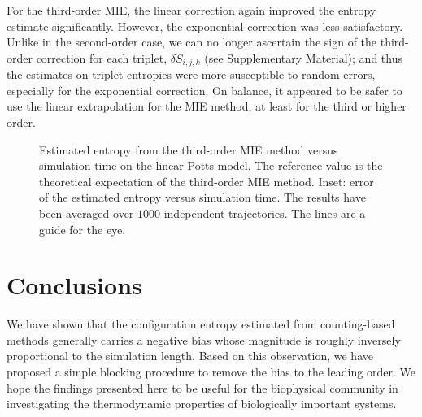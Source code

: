 \documentclass[reprint, superscriptaddress]{revtex4-1}
\begin{document}
For the third-order MIE,
the linear correction again improved the entropy estimate
significantly.
However, the exponential correction was less satisfactory.
%
Unlike in the second-order case,
we can no longer ascertain the sign of
the third-order correction for each triplet,
$\delta S_{i, j, k}$ (see Supplementary Material); %
and thus the estimates on triplet entropies
were more susceptible to random errors,
especially for the exponential correction.
%
On balance, it appeared to be safer
to use the linear extrapolation for the MIE method,
at least for the third or higher order.

\begin{figure}[h]\centering
  \caption{
    \label{fig:potts_mie3rd}
    Estimated entropy from the third-order MIE method
    versus simulation time on the linear Potts model.
    The reference value is the theoretical expectation
    of the third-order MIE method.
    Inset: error of the estimated entropy
    versus simulation time.
    The results have been averaged over $1000$ independent trajectories.
    The lines are a guide for the eye.
  }
\end{figure}

\section{Conclusions}

We have shown that the configuration entropy estimated from counting-based methods
generally carries a negative bias whose magnitude
is roughly inversely proportional to the simulation length.
%
Based on this observation, we have proposed a simple blocking procedure
to remove the bias to the leading order.
%
We hope the findings presented here to be useful
for the biophysical community
in investigating the thermodynamic properties of
biologically important systems.



\end{document}

